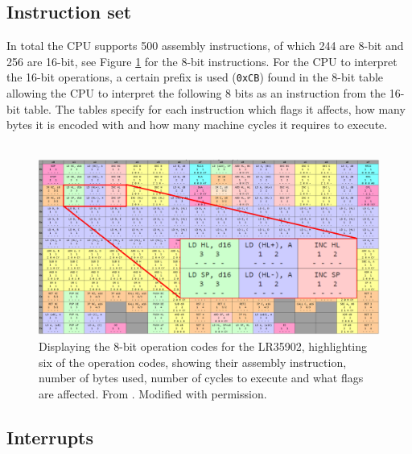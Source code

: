\subsection{Instruction set}
In total the CPU supports 500 assembly instructions, of which 244 are 8-bit and 256 are 16-bit, see Figure \ref{fig:8bitOpCodes} for the 8-bit instructions. For the CPU to interpret the 16-bit operations, a certain prefix is used (\texttt{0xCB}) found in the 8-bit table allowing the CPU to interpret the following 8 bits as an instruction from the 16-bit table. The tables specify for each instruction which flags it affects, how many bytes it is encoded with and how many machine cycles it requires to execute. 
\\\\
\begin{figure}[H]
    \centering
    \includegraphics[width=\textwidth]{figures/8bitOpCodes.PNG}
    \caption{Displaying the 8-bit operation codes for the LR35902, highlighting six of the operation codes, showing their assembly instruction, number of bytes used, number of cycles to execute and what flags are affected. From \cite{OpCodes}. Modified with permission.}
    \label{fig:8bitOpCodes}
\end{figure}


\subsection{Interrupts}
\label{sub}

